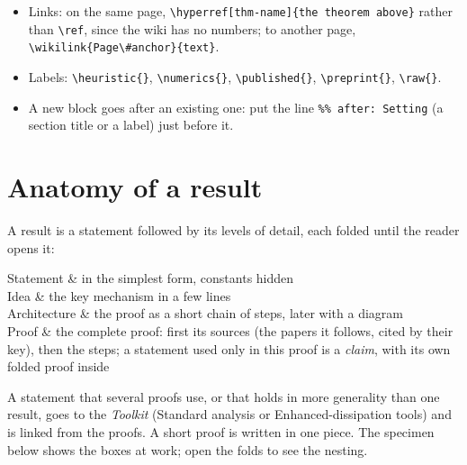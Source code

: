 \documentclass[11pt]{article}
\makeatletter
\theoremstyle{definition}
\theoremstyle{remark}
\newcommand{\wikilink}[2]{\ifx\relax#2\relax#1\else#2\fi}
\newcommand{\nowikicode}[1]{\texttt{\frenchspacing#1}}
\newenvironment{levels}[1][]{\par\smallskip\noindent\tabularx{\linewidth}{@{}>{\bfseries\raggedright\arraybackslash}p{0.2\linewidth}X@{}}}{\endtabularx\par\smallskip}
\newcommand{\lv}[2]{#1 & #2\\[3pt]}
\makeatother
\begin{document}
\begin{itemize}
  \item Links: on the same page, \nowikicode{\textbackslash{}hyperref[thm-name]\{the theorem above\}} rather than \nowikicode{\textbackslash{}ref}, since the wiki has no numbers; to another page, \nowikicode{\textbackslash{}wikilink\{Page\textbackslash{}\#\allowbreak{}anchor\}\allowbreak{}\{text\}}.
  \item Labels: \nowikicode{\textbackslash{}heuristic\{\}}, \nowikicode{\textbackslash{}numerics\{\}}, \nowikicode{\textbackslash{}published\{\}}, \nowikicode{\textbackslash{}preprint\{\}}, \nowikicode{\textbackslash{}raw\{\}}.
  \item A new block goes after an existing one: put the line \nowikicode{\%\% after: Setting} (a section title or a label) just before it.
\end{itemize}

\section{Anatomy of a result}
A result is a statement followed by its levels of detail, each folded until the reader opens it:
\begin{levels}
\lv{Statement}{in the simplest form, constants hidden}
\lv{Idea}{the key mechanism in a few lines}
\lv{Architecture}{the proof as a short chain of steps, later with a diagram}
\lv{Proof}{the complete proof: first its sources (the papers it follows, cited by their key), then the steps; a statement used only in this proof is a \emph{claim}, with its own folded proof inside}
\end{levels}
A statement that several proofs use, or that holds in more generality than one result, goes to the \emph{Toolkit} (\wikilink{Standard analysis}{} or \wikilink{Enhanced-dissipation tools}{}) and is linked from the proofs. A short proof is written in one piece. The specimen below shows the boxes at work; open the folds to see the nesting.
\end{document}

